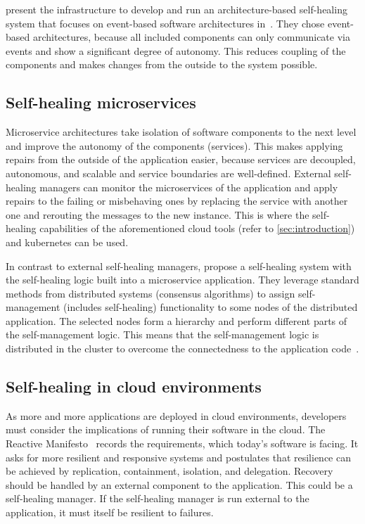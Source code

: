   \citeauthor{DashofyArchitecture} present the infrastructure to develop and run an architecture-based self-healing system that focuses on event-based software architectures in~\cite{DashofyArchitecture}.
  They chose event-based architectures, because all included components can only communicate via events and show a significant degree of autonomy.
  This reduces coupling of the components and makes changes from the outside to the system possible.

\subsection{Self-healing microservices}
  Microservice architectures take isolation of software components to the next level and improve the autonomy of the components (services).
  This makes applying repairs from the outside of the application easier, because services are decoupled, autonomous, and scalable and service boundaries are well-defined.
  External self-healing managers can monitor the microservices of the application and apply repairs to the failing or misbehaving ones by replacing the service with another one and rerouting the messages to the new instance.
  This is where the self-healing capabilities of the aforementioned cloud tools (refer to \cref{sec:introduction}) and \gls{kubernetes} can be used.

  In contrast to external self-healing managers, \citeauthor{ToffettiMicroservices} propose a self-healing system with the self-healing logic built into a microservice application.
  They leverage standard methods from distributed systems (\ie consensus algorithms) to assign self-management (includes self-healing) functionality to some nodes of the distributed application.
  The selected nodes form a hierarchy and perform different parts of the self-management logic.
  This means that the self-management logic is distributed in the cluster to overcome the connectedness to the application code~\cite{ToffettiMicroservices}.

\subsection{Self-healing in cloud environments}
  As more and more applications are deployed in cloud environments, developers must consider the implications of running their software in the cloud.
  The Reactive Manifesto~\cite{reactivemanifesto} records the requirements, which today's software is facing.
  It asks for more resilient and responsive systems and postulates that resilience can be achieved by replication, containment, isolation, and delegation.
  Recovery should be handled by an external component to the application.
  This could be a self-healing manager.
  If the self-healing manager is run external to the application, it must itself be resilient to failures.

